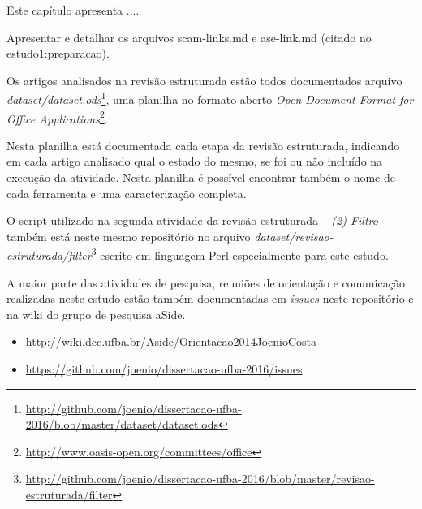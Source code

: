 {Este capítulo apresenta ....}
\label{reproducibilidade-do-estudo}



Apresentar e detalhar os arquivos scam-links.md e ase-link.md (citado no estudo1:preparacao).

Os artigos analisados na revisão estruturada estão todos documentados arquivo
{\it
dataset/dataset.ods}\footnote{\url{http://github.com/joenio/dissertacao-ufba-2016/blob/master/dataset/dataset.ods}},
uma planilha no formato aberto {\it Open Document Format for Office
Applications}\footnote{\url{http://www.oasis-open.org/committees/office}}.

Nesta planilha está documentada cada etapa da revisão estruturada, indicando em
cada artigo analisado qual o estado do mesmo, se foi ou não incluído na
execução da atividade.  Nesta planilha é possível encontrar também o nome de
cada ferramenta e uma caracterização completa.

O script utilizado na segunda atividade da revisão estruturada -- {\it (2)
Filtro} -- também está neste mesmo repositório no arquivo {\it
dataset/revisao-estruturada/filter}\footnote{\url{http://github.com/joenio/dissertacao-ufba-2016/blob/master/revisao-estruturada/filter}}
escrito em linguagem Perl especialmente para este estudo.

A maior parte das atividades de pesquisa, reuniões de orientação e comunicação
realizadas neste estudo estão também documentadas em {\it issues} neste
repositório e na wiki do grupo de pesquisa aSide.

\begin{itemize}
  \item \url{http://wiki.dcc.ufba.br/Aside/Orientacao2014JoenioCosta}
  \item \url{https://github.com/joenio/dissertacao-ufba-2016/issues}
\end{itemize}
